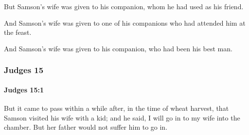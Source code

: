 			\begin{versebox}
					\item[BHS] 
					\item[ASV] But Samson's wife was given to his companion, whom he had used as his friend.
					\item[NIV] And Samson’s wife was given to one of his companions who had attended him at the feast.
					\item[NRSV] And Samson’s wife was given to his companion, who had been his best man.
			\end{versebox}
	\subsubsection{Judges 15} %
		\label{JUDGES-15}

		\paragraph{Judges 15:1} %
			\label{JUDGES-15-1}

			But it came to pass within a while after, in the time of wheat harvest, that Samson visited his wife with a kid; and he said, I will go in to my wife into the chamber. But her father would not suffer him to go in.

